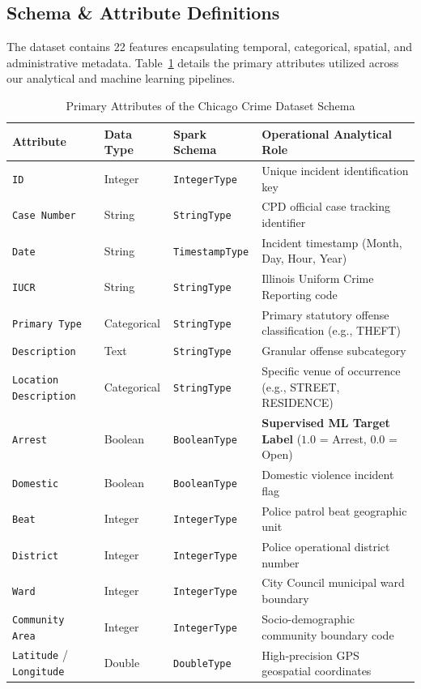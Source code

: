 \documentclass[11pt,a4paper]{article}
\begin{document}
\subsection{Schema \& Attribute Definitions}
The dataset contains 22 features encapsulating temporal, categorical, spatial, and administrative metadata. Table~\ref{tab:dataset_schema} details the primary attributes utilized across our analytical and machine learning pipelines.

\begin{table}[H]
    \centering
    \small
    \renewcommand{\arraystretch}{1.2}
    \caption{Primary Attributes of the Chicago Crime Dataset Schema}
    \label{tab:dataset_schema}
    \begin{tabular}{lllp{6.5cm}}
        \toprule
        \textbf{Attribute} & \textbf{Data Type} & \textbf{Spark Schema} & \textbf{Operational Analytical Role} \\
        \midrule
        \texttt{ID} & Integer & \texttt{IntegerType} & Unique incident identification key \\
        \texttt{Case Number} & String & \texttt{StringType} & CPD official case tracking identifier \\
        \texttt{Date} & String & \texttt{TimestampType} & Incident timestamp (Month, Day, Hour, Year) \\
        \texttt{IUCR} & String & \texttt{StringType} & Illinois Uniform Crime Reporting code \\
        \texttt{Primary Type} & Categorical & \texttt{StringType} & Primary statutory offense classification (e.g., THEFT) \\
        \texttt{Description} & Text & \texttt{StringType} & Granular offense subcategory \\
        \texttt{Location Description} & Categorical & \texttt{StringType} & Specific venue of occurrence (e.g., STREET, RESIDENCE) \\
        \texttt{Arrest} & Boolean & \texttt{BooleanType} & \textbf{Supervised ML Target Label} ($1.0$ = Arrest, $0.0$ = Open) \\
        \texttt{Domestic} & Boolean & \texttt{BooleanType} & Domestic violence incident flag \\
        \texttt{Beat} & Integer & \texttt{IntegerType} & Police patrol beat geographic unit \\
        \texttt{District} & Integer & \texttt{IntegerType} & Police operational district number \\
        \texttt{Ward} & Integer & \texttt{IntegerType} & City Council municipal ward boundary \\
        \texttt{Community Area} & Integer & \texttt{IntegerType} & Socio-demographic community boundary code \\
        \texttt{Latitude} / \texttt{Longitude} & Double & \texttt{DoubleType} & High-precision GPS geospatial coordinates \\
        \bottomrule
    \end{tabular}
\end{table}
\end{document}
